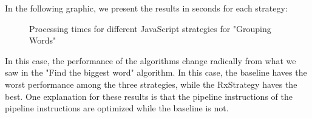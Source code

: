 In the following graphic, we present the results in seconds for each strategy:

\begin{figure}[H]
    \centering
    \caption{Processing times for different JavaScript strategies for "Grouping Words"}
    \label{fig:grouping_words_processing_times_js}
\end{figure}



In this case, the performance of the algorithms change radically from what we saw in the "Find the biggest word" algorithm. In this case, the baseline haves the worst performance among the three strategies, while the RxStrategy haves the best. 
One explanation for these results is that the pipeline instructions of the pipeline instructions are optimized while the baseline is not. 